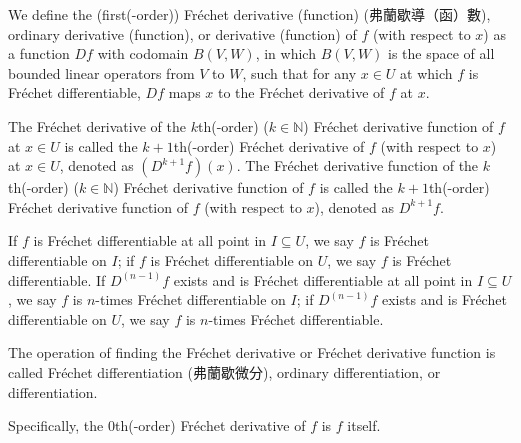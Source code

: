 \documentclass[a4paper,12pt]{report}
\begin{document}
\begin{itemize}
\begin{itemize}
We define the (first(-order)) Fréchet derivative (function) (弗蘭歇導（函）數), ordinary derivative (function), or derivative (function) of $f$ (with respect to $x$) as a function $Df$ with codomain $B(V,W)$, in which $B(V,W)$ is the space of all bounded linear operators from $V$ to $W$, such that for any $x\in U$ at which $f$ is Fréchet differentiable, $Df$ maps $x$ to the Fréchet derivative of $f$ at $x$.

The Fréchet derivative of the $k$th(-order) ($k\in\mathbb{N}$) Fréchet derivative function of $f$ at $x\in U$ is called the $k+1$th(-order) Fréchet derivative of $f$ (with respect to $x$) at $x\in U$, denoted as $(D^{k+1}f)(x)$. The Fréchet derivative function of the $k$th(-order) ($k\in\mathbb{N}$) Fréchet derivative function of $f$ is called the $k+1$th(-order) Fréchet derivative function of $f$ (with respect to $x$), denoted as $D^{k+1}f$.

If $f$ is Fréchet differentiable at all point in $I\subseteq U$, we say $f$ is Fréchet differentiable on $I$; if $f$ is Fréchet differentiable on $U$, we say $f$ is Fréchet differentiable. If $D^{(n-1)}f$ exists and is Fréchet differentiable at all point in $I\subseteq U$, we say $f$ is $n$-times Fréchet differentiable on $I$; if $D^{(n-1)}f$ exists and is Fréchet differentiable on $U$, we say $f$ is $n$-times Fréchet differentiable.

The operation of finding the Fréchet derivative or Fréchet derivative function is called Fréchet differentiation (弗蘭歇微分), ordinary differentiation, or differentiation.

Specifically, the $0$th(-order) Fréchet derivative of $f$ is $f$ itself.


\end{itemize}
\end{itemize}
\end{document}
